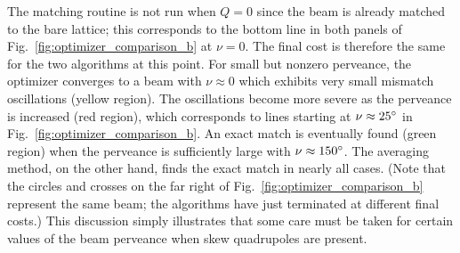 %
The matching routine is not run when $Q = 0$ since the beam is already matched to the bare lattice; this corresponds to the bottom line in both panels of Fig.~\ref{fig:optimizer_comparison_b} at $\nu = 0$. The final cost is therefore the same for the two algorithms at this point. For small but nonzero perveance, the optimizer converges to a beam with $\nu \approx 0$ which exhibits very small mismatch oscillations (yellow region). The oscillations become more severe as the perveance is increased (red region), which corresponds to lines starting at $\nu \approx 25\degree$ in Fig.~\ref{fig:optimizer_comparison_b}. An exact match is eventually found (green region) when the perveance is sufficiently large with $\nu \approx 150\degree$. The averaging method, on the other hand, finds the exact match in nearly all cases. (Note that the circles and crosses on the far right of Fig.~\ref{fig:optimizer_comparison_b} represent the same beam; the algorithms have just terminated at different final costs.) This discussion simply illustrates that some care must be taken for certain values of the beam perveance when skew quadrupoles are present.

